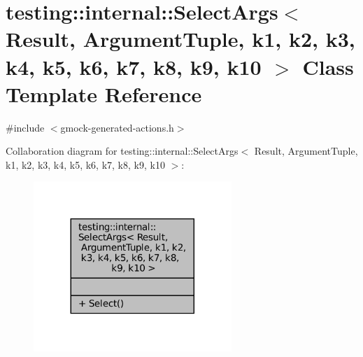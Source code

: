 \hypertarget{classtesting_1_1internal_1_1SelectArgs}{}\section{testing\+:\+:internal\+:\+:Select\+Args$<$ Result, Argument\+Tuple, k1, k2, k3, k4, k5, k6, k7, k8, k9, k10 $>$ Class Template Reference}
\label{classtesting_1_1internal_1_1SelectArgs}


{\ttfamily \#include $<$gmock-\/generated-\/actions.\+h$>$}



Collaboration diagram for testing\+:\+:internal\+:\+:Select\+Args$<$ Result, Argument\+Tuple, k1, k2, k3, k4, k5, k6, k7, k8, k9, k10 $>$\+:
\nopagebreak
\begin{figure}[H]
\begin{center}
\leavevmode
\includegraphics[width=212pt]{classtesting_1_1internal_1_1SelectArgs__coll__graph}
\end{center}
\end{figure}
